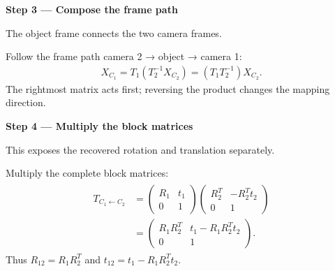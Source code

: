 \documentclass[letterpaper,11pt,english,openany,oneside]{jupyterBook}
\begin{document}
\par

\par\medskip{}
{\color{QuizStepRed}\bfseries Step 3 — Compose the frame path}\par\smallskip

\sphinxAtStartPar
{} The object frame connects the two camera frames.

\sphinxAtStartPar
Follow the frame path camera 2 → object → camera 1:
{\color{QuizMathBlue} \begin{equation*}
\begin{split}
X_{C_1}=T_1(T_2^{-1}X_{C_2})=(T_1T_2^{-1})X_{C_2}.
\end{split}
\end{equation*}}
\sphinxAtStartPar
The rightmost matrix acts first; reversing the product changes the mapping direction.

\par

\par\medskip{}
{\color{QuizStepRed}\bfseries Step 4 — Multiply the block matrices}\par\smallskip

\sphinxAtStartPar
{} This exposes the recovered rotation and translation separately.

\sphinxAtStartPar
Multiply the complete block matrices:
{\color{QuizMathBlue} \begin{equation*}
\begin{split}
\begin{aligned}
T_{C_1\leftarrow C_2}
&=\begin{pmatrix}R_1&t_1\\0&1\end{pmatrix}
\begin{pmatrix}R_2^T&-R_2^Tt_2\\0&1\end{pmatrix}\\
&=\begin{pmatrix}R_1R_2^T&t_1-R_1R_2^Tt_2\\0&1\end{pmatrix}.
\end{aligned}
\end{split}
\end{equation*}}
\sphinxAtStartPar
Thus {\color{QuizMathBlue} \(R_{12}=R_1R_2^T\)} and {\color{QuizMathBlue} \(t_{12}=t_1-R_1R_2^Tt_2\)}.

\par
\end{document}
